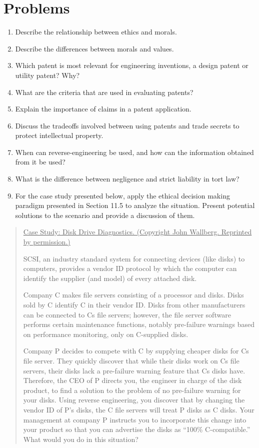 \section{Problems}
\label{section:ethicsProblems}

\begin{enumerate}
\def\labelenumi{\arabic{enumi}.}
\item
  Describe the relationship between ethics and morals.
\item
  Describe the differences between morals and values.
\item
  Which patent is most relevant for engineering inventions, a design
  patent or utility patent? Why?
\item
  What are the criteria that are used in evaluating patents?
\item
  Explain the importance of claims in a patent application.
\item
  Discuss the tradeoffs involved between using patents and trade secrets
  to protect intellectual property.
\item
  When can reverse-engineering be used, and how can the information
  obtained from it be used?
\item
  What is the difference between negligence and strict liability in tort
  law?
\item
  For the case study presented below, apply the ethical decision making
  paradigm presented in Section 11.5 to analyze the situation. Present
  potential solutions to the scenario and provide a discussion of them.
\end{enumerate}

\begin{quote}
\ul{\hfill\break
Case Study: Disk Drive Diagnostics. (Copyright John Wallberg. Reprinted
by permission.)}

SCSI, an industry standard system for connecting devices (like disks) to
computers, provides a vendor ID protocol by which the computer can
identify the supplier (and model) of every attached disk.

Company C makes file servers consisting of a processor and disks. Disks
sold by C identify C in their vendor ID. Disks from other manufacturers
can be connected to C\textquotesingle s file servers; however, the file
server software performs certain maintenance functions, notably
pre-failure warnings based on performance monitoring, only on C-supplied
disks.

Company P decides to compete with C by supplying cheaper disks for
C\textquotesingle s file server. They quickly discover that while their
disks work on C\textquotesingle s file servers, their disks lack a
pre-failure warning feature that C\textquotesingle s disks have.
Therefore, the CEO of P directs you, the engineer in charge of the disk
product, to find a solution to the problem of no pre-failure warning for
your disks. Using reverse engineering, you discover that by changing the
vendor ID of P's disks, the C file servers will treat P disks as C
disks. Your management at company P instructs you to incorporate this
change into your product so that you can advertise the disks as ``100\%
C-compatible.'' What would you do in this situation?
\end{quote}

